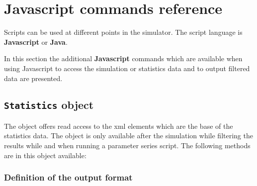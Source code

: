 \part{Javascript commands reference}

Scripts can be used at different points in the simulator.
The script language is \textbf{Javascript} or \textbf{Java}.

In this section the additional \textbf{Javascript} commands which
are available when using Javascript to access the
simulation or statistics data and to output filtered data are
presented.



\chapter{\texttt{Statistics} object}

The  object offers read access to the xml elements which are the
base of the statistics data. The  object is only available after the
simulation while filtering the results while and when running a parameter series script.
The following methods are in this object available:

\section{Definition of the output format}

